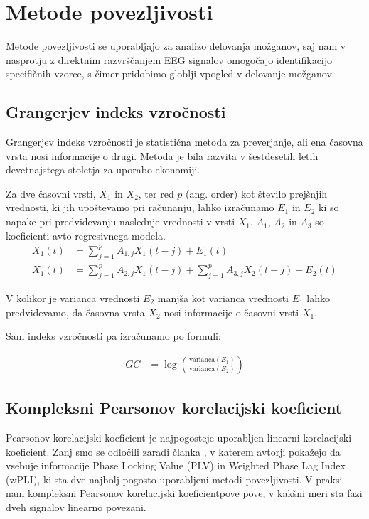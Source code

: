 \section{Metode povezljivosti}
Metode povezljivosti se uporabljajo za analizo delovanja možganov, saj nam v nasprotju z direktnim razvrščanjem EEG signalov omogočajo identifikacijo specifičnih vzorce, s čimer pridobimo globlji vpogled v delovanje možganov.

\subsection{Grangerjev indeks vzročnosti}
Grangerjev indeks vzročnosti je statistična metoda za preverjanje, ali ena časovna vrsta nosi informacije o drugi. Metoda je bila razvita v šestdesetih letih devetnajstega stoletja za uporabo ekonomiji. \cite{cohenAnalyzingNeuralTime2014}

Za dve časovni vrsti, $X_1$ in $X_2$, ter red $p$ (ang. order) kot število prejšnjih vrednosti, ki jih upoštevamo pri računanju, lahko izračunamo $E_1$ in $E_2$ ki so napake pri predvidevanju naslednje vrednosti v vrsti $X_1$. $A_1$, $A_2$ in $A_3$ so koeficienti avto-regresivnega modela. \cite{sethGrangerCausality2007}
\begin{align*}
X_1(t) &= \sum_{j=1}^{p} A_{1,j} X_1(t-j) + E_1(t)\\
X_1(t) &= \sum_{j=1}^{p} A_{2,j} X_1(t-j) + \sum_{j=1}^{p} A_{3,j} X_2(t-j) + E_2(t)
\end{align*}

V kolikor je varianca vrednosti $E_2$ manjša kot varianca vrednosti $E_1$ lahko predvidevamo, da časovna vrsta $X_2$ nosi informacije o časovni vrsti $X_1$.  \cite{sethGrangerCausality2007}

Sam indeks vzročnosti pa izračunamo po formuli:

\begin{align*}
GC &= \log \left( \frac{\mathrm{varianca}(E_1)}{\mathrm{varianca}(E_2)} \right)
\end{align*}

\subsection{Kompleksni Pearsonov korelacijski koeficient}
Pearsonov korelacijski koeficient je najpogosteje uporabljen linearni korelacijski koeficient. Zanj smo se odločili zaradi članka , v katerem avtorji pokažejo da vsebuje informacije Phase Locking Value (PLV) in Weighted Phase Lag Index (wPLI), ki sta dve najbolj pogosto uporabljeni metodi povezljivosti. V praksi nam kompleksni Pearsonov korelacijski koeficientpove pove, v kakšni meri sta fazi dveh signalov linearno povezani. \cite{sverkoComplexPearsonCorrelation2022} 

